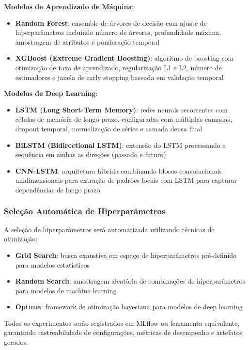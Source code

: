 \textbf{Modelos de Aprendizado de Máquina}:
\begin{itemize}
    \item \textbf{Random Forest}: ensemble de árvores de decisão com ajuste de hiperparâmetros incluindo número de árvores, profundidade máxima, amostragem de atributos e ponderação temporal
    \item \textbf{XGBoost (Extreme Gradient Boosting)}: algoritmo de boosting com otimização de taxa de aprendizado, regularização L1 e L2, número de estimadores e janela de early stopping baseada em validação temporal
\end{itemize}

\textbf{Modelos de Deep Learning}:
\begin{itemize}
    \item \textbf{LSTM (Long Short-Term Memory)}: redes neurais recorrentes com células de memória de longo prazo, configuradas com múltiplas camadas, dropout temporal, normalização de séries e camada densa final
    \item \textbf{BiLSTM (Bidirectional LSTM)}: extensão do LSTM processando a sequência em ambas as direções (passado e futuro)
    \item \textbf{CNN-LSTM}: arquitetura híbrida combinando blocos convolucionais unidimensionais para extração de padrões locais com LSTM para capturar dependências de longo prazo
\end{itemize}

\subsubsection{Seleção Automática de Hiperparâmetros}

A seleção de hiperparâmetros será automatizada utilizando técnicas de otimização:
\begin{itemize}
    \item \textbf{Grid Search}: busca exaustiva em espaço de hiperparâmetros pré-definido para modelos estatísticos
    \item \textbf{Random Search}: amostragem aleatória de combinações de hiperparâmetros para modelos de machine learning
    \item \textbf{Optuna}: framework de otimização bayesiana para modelos de deep learning
\end{itemize}

Todos os experimentos serão registrados em MLflow ou ferramenta equivalente, garantindo rastreabilidade de configurações, métricas de desempenho e artefatos gerados.

